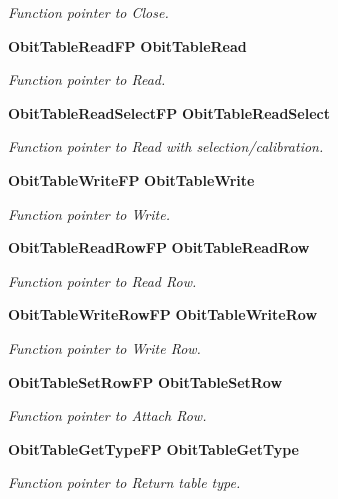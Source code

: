 \begin{CompactItemize}
\begin{CompactList}\small\item\em Function pointer to Close. \item\end{CompactList}\item 
{\bf Obit\-Table\-Read\-FP} {\bf Obit\-Table\-Read}
\begin{CompactList}\small\item\em Function pointer to Read. \item\end{CompactList}\item 
{\bf Obit\-Table\-Read\-Select\-FP} {\bf Obit\-Table\-Read\-Select}
\begin{CompactList}\small\item\em Function pointer to Read with selection/calibration. \item\end{CompactList}\item 
{\bf Obit\-Table\-Write\-FP} {\bf Obit\-Table\-Write}
\begin{CompactList}\small\item\em Function pointer to Write. \item\end{CompactList}\item 
{\bf Obit\-Table\-Read\-Row\-FP} {\bf Obit\-Table\-Read\-Row}
\begin{CompactList}\small\item\em Function pointer to Read Row. \item\end{CompactList}\item 
{\bf Obit\-Table\-Write\-Row\-FP} {\bf Obit\-Table\-Write\-Row}
\begin{CompactList}\small\item\em Function pointer to Write Row. \item\end{CompactList}\item 
{\bf Obit\-Table\-Set\-Row\-FP} {\bf Obit\-Table\-Set\-Row}
\begin{CompactList}\small\item\em Function pointer to Attach Row. \item\end{CompactList}\item 
{\bf Obit\-Table\-Get\-Type\-FP} {\bf Obit\-Table\-Get\-Type}
\begin{CompactList}\small\item\em Function pointer to Return table type. \item\end{CompactList}\item 

\end{CompactItemize}
